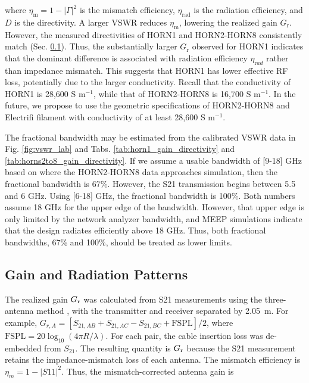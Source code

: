 \documentclass[electronics,article,submit,pdftex,moreauthors]{Definitions/mdpi}
\begin{document}
\noindent
where $\eta_{\mathrm m}=1-|\Gamma|^2$ is the mismatch efficiency, $\eta_{\mathrm{rad}}$ is the radiation efficiency, and $D$ is the directivity. A larger VSWR reduces $\eta_{\mathrm m}$, lowering the realized gain $G_{\mathrm r}$.  However, the measured directivities of HORN1 and HORN2-HORN8 consistently match (Sec. \ref{sec:rad_patterns}).  Thus, the substantially larger $G_{\mathrm r}$ observed for HORN1 indicates that the dominant difference is associated with radiation efficiency $\eta_{\mathrm rad}$ rather than impedance mismatch. This suggests that HORN1 has lower effective RF loss, potentially due to the larger conductivity.  Recall that the conductivity of HORN1 is 28,600 S m$^{-1}$, while that of HORN2-HORN8 is 16,700 S m$^{-1}$.  In the future, we propose to use the geometric specifications of HORN2-HORN8 and Electrifi filament with conductivity of at least 28,600 S m$^{-1}$.

The fractional bandwidth may be estimated from the calibrated VSWR data in Fig. \ref{fig:vswr_lab} and Tabs. \ref{tab:horn1_gain_directivity} and \ref{tab:horns2to8_gain_directivity}.  If we assume a usable bandwidth of [9-18] GHz based on where the HORN2-HORN8 data approaches simulation, then the fractional bandwidth is 67\%.  However, the S21 transmission begins between 5.5 and 6 GHz.  Using [6-18] GHz, the fractional bandwidth is 100\%.  Both numbers assume 18 GHz for the upper edge of the bandwidth.  However, that upper edge is only limited by the network analyzer bandwidth, and MEEP simulations indicate that the design radiates efficiently above 18 GHz.  Thus, both fractional bandwidths, 67\% and 100\%, should be treated as lower limits.

\subsection{Gain and Radiation Patterns}
\label{sec:rad_patterns}

The realized gain $G_{\rm r}$ was calculated from S21 measurements using the three-antenna method \cite{Balanis2016AntennaTheory}, with the transmitter and receiver separated by 2.05~m.  For example, $G_{r,A}=[S_{21,AB}+S_{21,AC}-S_{21,BC}+\mathrm{FSPL}]/2$, where $\mathrm{FSPL}=20\log_{10}(4\pi R/\lambda)$.  For each pair, the cable insertion loss was de-embedded from $S_{21}$.  The resulting quantity is $G_{\rm r}$ because the S21 measurement retains the impedance-mismatch loss of each antenna. The mismatch efficiency is $\eta_m=1-|S11|^2$.  Thus, the mismatch-corrected antenna gain is
\end{document}
